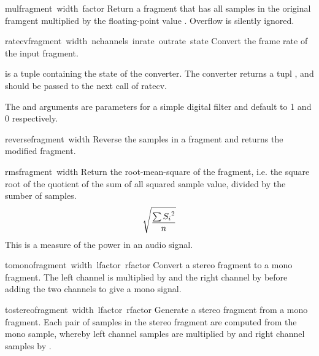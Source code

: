 \begin{funcdesc}{mul}{fragment\, width\, factor}
Return a fragment that has all samples in the original framgent
multiplied by the floating-point value .  Overflow is
silently ignored.
\end{funcdesc}

\begin{funcdesc}{ratecv}{fragment\, width\, nchannels\, inrate\, outrate\, state}
Convert the frame rate of the input fragment.

 is a tuple containing the state of the converter.  The
converter returns a tupl ,
and  should be passed to the next call of ratecv.

The  and  arguments are parameters for a
simple digital filter and default to 1 and 0 respectively.
\end{funcdesc}

\begin{funcdesc}{reverse}{fragment\, width}
Reverse the samples in a fragment and returns the modified fragment.
\end{funcdesc}

\begin{funcdesc}{rms}{fragment\, width}
Return the root-mean-square of the fragment, i.e.
\iftexi
the square root of the quotient of the sum of all squared sample value,
divided by the sumber of samples.
\else
\begin{displaymath}
\catcode`_=8
\sqrt{\frac{\sum{{S_{i}}^{2}}}{n}}
\end{displaymath}
\fi
This is a measure of the power in an audio signal.
\end{funcdesc}

\begin{funcdesc}{tomono}{fragment\, width\, lfactor\, rfactor} 
Convert a stereo fragment to a mono fragment.  The left channel is
multiplied by  and the right channel by 
before adding the two channels to give a mono signal.
\end{funcdesc}

\begin{funcdesc}{tostereo}{fragment\, width\, lfactor\, rfactor}
Generate a stereo fragment from a mono fragment.  Each pair of samples
in the stereo fragment are computed from the mono sample, whereby left
channel samples are multiplied by  and right channel
samples by .
\end{funcdesc}

